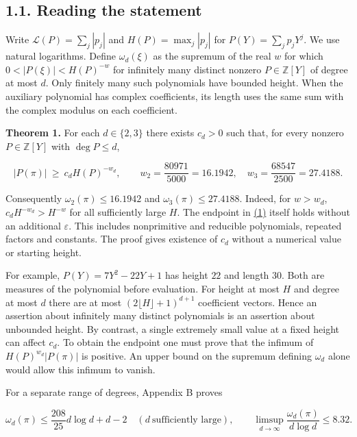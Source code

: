 \documentclass[11pt,a4paper]{article}
\begin{document}
\subsection{1.1. Reading the statement}\label{reading-the-statement}

Write \(\mathcal L(P)=\sum_j |p_j|\) and \(H(P)=\max_j |p_j|\) for \(P(Y)=\sum_j p_jY^j\). We use natural logarithms. Define \(\omega_d(\xi)\) as the supremum of the real \(w\) for which \(0<|P(\xi)|<H(P)^{-w}\) for infinitely many distinct nonzero \(P\in\mathbb Z[Y]\) of degree at most \(d\). Only finitely many such polynomials have bounded height. When the auxiliary polynomial has complex coefficients, its length uses the same sum with the complex modulus on each coefficient.

\textbf{Theorem 1.} For each \(d\in\{2,3\}\) there exists \(c_d>0\) such that, for every nonzero \(P\in\mathbb Z[Y]\) with \(\deg P\le d\),

\[
 |P(\pi)|\ \ge\ c_d H(P)^{-w_d},\qquad
 w_2=\frac{80971}{5000}=16.1942,\quad
 w_3=\frac{68547}{2500}=27.4188.                                      \tag{1}\label{eq:1}
\]

Consequently \(\omega_2(\pi)\le16.1942\) and \(\omega_3(\pi)\le27.4188\). Indeed, for \(w>w_d\), \(c_dH^{-w_d}>H^{-w}\) for all sufficiently large \(H\). The endpoint in \hyperref[eq:1]{(1)} itself holds without an additional \(\varepsilon\). This includes nonprimitive and reducible polynomials, repeated factors and constants. The proof gives existence of \(c_d\) without a numerical value or starting height.

For example, \(P(Y)=7Y^2-22Y+1\) has height \(22\) and length \(30\). Both are measures of the polynomial before evaluation. For height at most \(H\) and degree at most \(d\) there are at most \((2\lfloor H\rfloor+1)^{d+1}\) coefficient vectors. Hence an assertion about infinitely many distinct polynomials is an assertion about unbounded height. By contrast, a single extremely small value at a fixed height can affect \(c_d\). To obtain the endpoint one must prove that the infimum of \(H(P)^{w_d}|P(\pi)|\) is positive. An upper bound on the supremum defining \(\omega_d\) alone would allow this infimum to vanish.

For a separate range of degrees, Appendix B proves

\[
 \omega_d(\pi)\le \frac{208}{25}d\log d+d-2\quad(d\ \text{sufficiently large}),\qquad
 \limsup_{d\to\infty}\frac{\omega_d(\pi)}{d\log d}\le 8.32.              \tag{2}\label{eq:2}
\]
\end{document}
